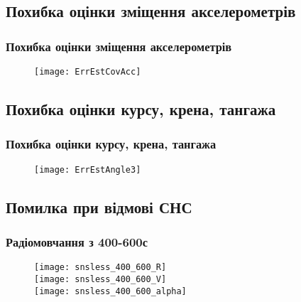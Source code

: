 \documentclass[ucs,compress]{beamer}    %
\begin{document}
\subsection{Похибка оцінки зміщення акселерометрів} 
\begin{frame}%
\frametitle{Похибка оцінки зміщення акселерометрів}
\begin{figure}
\centering
\texttt{[image: ErrEstCovAcc]}
\end{figure}
\end{frame}
\subsection{Похибка оцінки курсу, крена, тангажа} 
\begin{frame}%
\frametitle{Похибка оцінки курсу, крена, тангажа}
\begin{figure}
\centering
\texttt{[image: ErrEstAngle3]}
\end{figure}
\end{frame}

\subsection{Помилка при відмові СНС} 
\begin{frame}%
\frametitle{Радіомовчання з 400-600с}
\begin{figure}
\texttt{[image: snsless\_400\_600\_R]}\\
\texttt{[image: snsless\_400\_600\_V]}\\
\texttt{[image: snsless\_400\_600\_alpha]}\\
\end{figure}
\end{frame}
\end{document}
